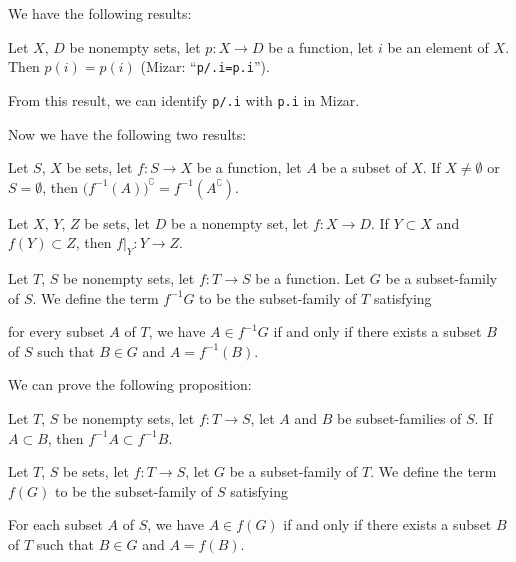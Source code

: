 \documentclass{article}
\begin{document}
We have the following results:
\begin{thm}
\item\label{funct2:99} Let $X$, $D$ be nonempty sets, let $p\colon X\to D$
  be a function, let $i$ be an element of $X$. Then $p(i)=p(i)$ (Mizar:
  ``\verb#p/.i=p.i#'').
\end{thm}
From this result, we can identify \verb#p/.i# with \verb#p.i# in Mizar.

Now we have the following two results:
\begin{thm}
\item\label{funct2:100} Let $S$, $X$ be sets, let $f\colon S\to X$ be a
  function, let $A$ be a subset of $X$. If $X\neq\emptyset$ or
  $S=\emptyset$,
  then $\bigl(f^{-1}(A)\bigr)^{\complement}=f^{-1}(A^{\complement})$.
\item\label{funct2:101} Let $X$, $Y$, $Z$ be sets, let $D$ be a nonempty
  set, let $f\colon X\to D$. If $Y\subset X$ and $f(Y)\subset Z$, then
  $f|_{Y}\colon Y\to Z$.
\end{thm}

\begin{definition}
Let $T$, $S$ be nonempty sets, let $f\colon T\to S$ be a function.
Let $G$ be a subset-family of $S$.
We define the term $f^{-1}G$ to be the subset-family of $T$ satisfying
\begin{defn}
\item for every subset $A$ of $T$, we have $A\in f^{-1}G$ if and only if
  there exists a subset $B$ of $S$ such that $B\in G$ and $A=f^{-1}(B)$.
\end{defn}
\end{definition}

We can prove the following proposition:
\begin{thm}
\item\label{funct2:102} Let $T$, $S$ be nonempty sets, let $f\colon T\to S$,
  let $A$ and $B$ be subset-families of $S$. If $A\subset B$, then
  $f^{-1}A\subset f^{-1}B$.
\end{thm}

\begin{definition}
Let $T$, $S$ be sets, let $f\colon T\to S$, let $G$ be a subset-family
of $T$. We define the term $f(G)$ to be the subset-family of $S$
satisfying
\begin{defn}
\item For each subset $A$ of $S$, we have $A\in f(G)$ if and only if
  there exists a subset $B$ of $T$ such that $B\in G$ and $A=f(B)$.
\end{defn}
\end{definition}
\end{document}
